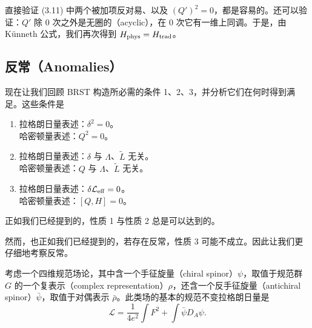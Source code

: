 直接验证 (3.11) 中两个被加项反对易、以及 $(Q')^2=0$，都是容易的。还可以验证：$Q'$ 除 0 次之外是无圈的（acyclic），在 0 次它有一维上同调。于是，由 Künneth 公式，我们再次得到 $H_{\rm phys}=H_{\rm trad}$。


\subsection{反常（Anomalies）}

现在让我们回顾 BRST 构造所必需的条件 1、2、3，并分析它们在何时得到满足。这些条件是

\begin{enumerate}
\item 拉格朗日量表述：$\delta^2=0$。\\
     哈密顿量表述：$Q^2=0$。
\item 拉格朗日量表述：$\delta$ 与 $\Lambda$、$\widetilde L$ 无关。\\
     哈密顿量表述：$Q$ 与 $\Lambda$、$\widetilde L$ 无关。
\item 拉格朗日量表述：$\delta\mathcal L_{\rm eff}=0$。\\
     哈密顿量表述：$[Q,H]=0$。
\end{enumerate}


正如我们已经提到的，性质 1 与性质 2 总是可以达到的。

然而，也正如我们已经提到的，若存在反常，性质 3 可能不成立。因此让我们更仔细地考察反常。

考虑一个四维规范场论，其中含一个手征旋量（chiral spinor）$\psi$，取值于规范群 $G$ 的一个复表示（complex representation）$\rho$，还含一个反手征旋量（antichiral spinor）$\bar\psi$，取值于对偶表示 $\bar\rho$。此类场的基本的规范不变拉格朗日量是
\begin{equation}
  \tag{3.12}
  \label{eq:3-12}
  \mathcal L=\frac{1}{4e^2}\int F^2+\int\bar\psi D_A\psi .
\end{equation}

